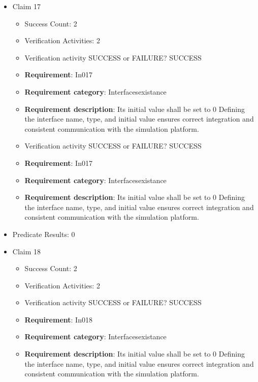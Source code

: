 \documentclass{article}
\begin{document}
\begin{itemize}
  				  \item Claim 17
				\begin{itemize}
			    	\item Success Count: 2 
			    	\item Verification Activities: 2
					\item Verification activity SUCCESS or FAILURE? SUCCESS
		
						\item \textbf{Requirement}: In017 
						\item \textbf{Requirement category}: Interfacesexistance 
						\item \textbf{Requirement description}: Its initial value shall be set to 0 Defining the interface name, type, and initial value ensures correct integration and consistent communication with the simulation platform.
					
					\item Verification activity SUCCESS or FAILURE? SUCCESS
		
						\item \textbf{Requirement}: In017 
						\item \textbf{Requirement category}: Interfacesexistance 
						\item \textbf{Requirement description}: Its initial value shall be set to 0 Defining the interface name, type, and initial value ensures correct integration and consistent communication with the simulation platform.
					
				\end{itemize}
				
									    
				\item Predicate Results: 0

  				  \item Claim 18
				\begin{itemize}
			    	\item Success Count: 2 
			    	\item Verification Activities: 2
					\item Verification activity SUCCESS or FAILURE? SUCCESS
		
						\item \textbf{Requirement}: In018 
						\item \textbf{Requirement category}: Interfacesexistance 
						\item \textbf{Requirement description}: Its initial value shall be set to 0 Defining the interface name, type, and initial value ensures correct integration and consistent communication with the simulation platform.
					

\end{itemize}
\end{itemize}
\end{document}
